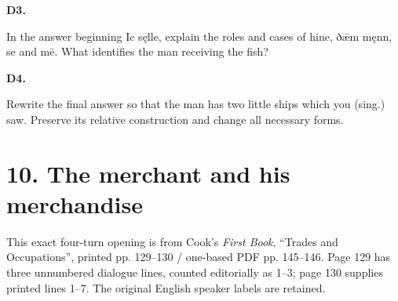 \par\begin{minipage}{\linewidth}\raggedright
\textbf{D3.}

In the answer beginning Ic sęlle, explain the roles and cases of hine, ðǣm męnn, se and mē. What identifies the man receiving the fish?

\end{minipage}\par\addvspace{4pt}

\par\begin{minipage}{\linewidth}\raggedright
\textbf{D4.}

Rewrite the final answer so that the man has two little ships which you (sing.) saw. Preserve its relative construction and change all necessary forms.

\end{minipage}\par\addvspace{4pt}

\section*{10. The merchant and his merchandise}

This exact four-turn opening is from Cook’s \emph{First Book}, “Trades and Occupations”, printed pp. 129–130 /\allowbreak{} one-based PDF pp. 145–146. Page 129 has three unnumbered dialogue lines, counted editorially as 1–3; page 130 supplies printed lines 1–7. The original English speaker labels are retained.

